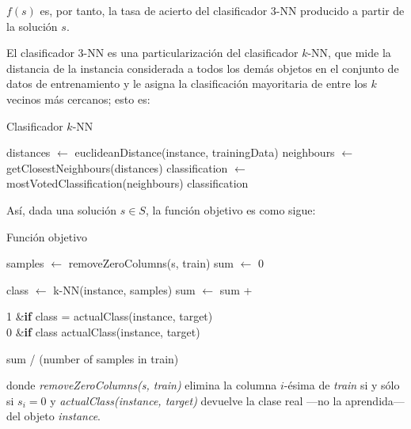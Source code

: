 \documentclass[a4paper, 11pt, titlepage]{article}
\begin{document}
    $f(s)$ es, por tanto, la tasa de acierto del clasificador 3-NN producido a partir de la solución $s$.

    El clasificador 3-NN es una particularización del clasificador $k$-NN, que mide la distancia de la instancia considerada a todos los demás objetos en el conjunto de datos de entrenamiento y le asigna la clasificación mayoritaria de entre los $k$ vecinos más cercanos; esto es:

    \begin{algorithm}
        \caption{Clasificador $k$-NN}\label{knn}
        \begin{algorithmic}[1]
            \State distances $\gets$ euclideanDistance(instance, trainingData)
            \State neighbours $\gets$ getClosestNeighbours(distances)
            \State classification $\gets$ mostVotedClassification(neighbours)
            \State \Return classification
            \EndFunction
        \end{algorithmic}
    \end{algorithm}

    Así, dada una solución $s \in S$, la función objetivo es como sigue:

    \begin{algorithm}
        \caption{Función objetivo}\label{f_objetivo}
        \begin{algorithmic}[1]
            \State samples $\gets$ removeZeroColumns(s, train)
            \State sum $\gets$ 0

                \State class $\gets$ k-NN(instance, samples)
                \State sum $\gets$ sum + \begin{cases}
                        1 &\textrm{\textbf{if} } \textrm{class} = \textrm{actualClass(instance, target)} \\
                        0 &\textrm{\textbf{if} } \textrm{class} \neq \textrm{actualClass(instance, target)}
                    \end{cases}
            \EndFor

            \State \Return sum / (number of samples in train)
            \EndFunction
        \end{algorithmic}
    \end{algorithm}
    donde \emph{removeZeroColumns(s, train)} elimina la columna $i$-ésima de \emph{train} si y sólo si $s_i = 0$ y \emph{actualClass(instance, target)} devuelve la clase real ---no la aprendida--- del objeto \emph{instance}.
\end{document}
